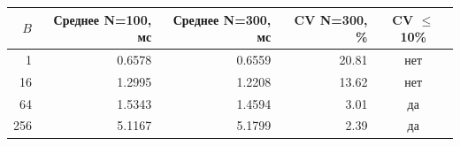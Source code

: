 \begin{tabular}{rrrrc}
\toprule
$B$ & Среднее N=100, мс & Среднее N=300, мс & CV N=300, \% & CV $\leq$ 10\% \\
\midrule
1 & 0.6578 & 0.6559 & 20.81 & нет \\
16 & 1.2995 & 1.2208 & 13.62 & нет \\
64 & 1.5343 & 1.4594 & 3.01 & да \\
256 & 5.1167 & 5.1799 & 2.39 & да \\
\bottomrule
\end{tabular}
